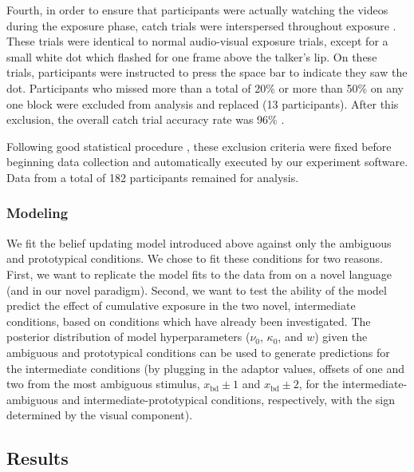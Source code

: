 Fourth, in order to ensure that participants were actually watching the videos during the exposure phase, catch trials were interspersed throughout exposure \autocite[as in][]{Vroomen2007}.  These trials were identical to normal audio-visual exposure trials, except for a small white dot which flashed for one frame above the talker's lip.  On these trials, participants were instructed to press the space bar to indicate they saw the dot.  Participants who missed more than a total of 20\% or more than 50\% on any one block were excluded from analysis and replaced (13 participants).  After this exclusion, the overall catch trial accuracy rate was 96\% \autocite[compared to 93\% reported by][]{Vroomen2007}.

Following good statistical procedure \autocite{Simmons2011}, these exclusion criteria were fixed before beginning data collection and automatically executed by our experiment software.
Data from a total of 182 participants remained for analysis.

\subsubsection{Modeling}
\label{sec:modeling-intr-analysis}

We fit the belief updating model introduced above against only the ambiguous and prototypical conditions.  We chose to fit these conditions for two reasons.  First, we want to replicate the model fits to the data from \textcite{Vroomen2007} on a novel language (and in our novel paradigm).  Second, we want to test the ability of the model predict the effect of cumulative exposure in the two novel, intermediate conditions, based on conditions which have already been investigated.  The posterior distribution of model hyperparameters ($\nu_0$, $\kappa_0$, and $w$) given the ambiguous and prototypical conditions can be used to generate predictions for the intermediate conditions (by plugging in the adaptor values, offsets of one and two from the most ambiguous stimulus, $x_\mathrm{bd} \pm 1$ and $x_\mathrm{bd} \pm 2$, for the intermediate-ambiguous and intermediate-prototypical conditions, respectively, with the sign determined by the visual component).

\subsection{Results}
\label{sec:results-4}

